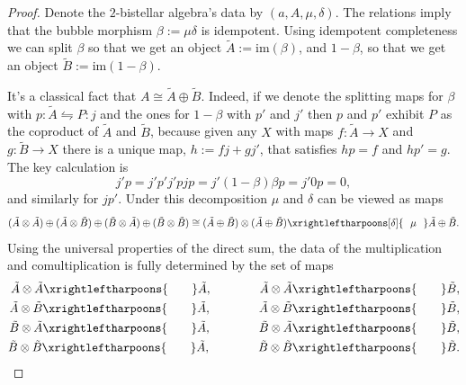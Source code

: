 \documentclass[12pt,a4paper]{article}
\numberwithin{equation}{section}
\begin{document}
\begin{proof}
    Denote the $2$-bistellar algebra's data by $(a, A, \mu, \delta)$. The relations imply that the bubble morphism $\beta := \mu \delta$ is idempotent. Using idempotent completeness we can split $\beta$ so that we get an object $\tilde{A}:= \mathrm{im}(\beta)$, and $1 - \beta$, so that we get an object $\tilde{B} := \mathrm{im}(1 - \beta)$. 
    
    It's a classical fact that $A \cong \tilde{A} \oplus \tilde{B}$. Indeed, if we denote the splitting maps for $\beta$ with $p: \tilde{A} \leftrightharpoons P: j$ and the ones for $1 - \beta$ with $p'$ and $j'$ then $p$ and $p'$ exhibit $P$ as the coproduct of $\tilde{A}$ and $\tilde{B}$, because given any $X$ with maps $f: \tilde{A} \to X$ and $g: \tilde{B} \to X$ there is a unique map, $h := f j + g j'$, that satisfies $h p = f$ and $h p' = g$. The key calculation is
    \begin{equation}
        j' p = j' p' j' p j p = j' (1 - \beta) \beta p = j' 0 p = 0,
    \end{equation}
    and similarly for $j p'$. Under this decomposition $\mu$ and $\delta$ can be viewed as maps
    \begin{equation}
        (\tilde{A} \otimes \tilde{A}) \oplus (\tilde{A} \otimes \tilde{B}) \oplus (\tilde{B} \otimes \tilde{A}) \oplus (\tilde{B} \otimes \tilde{B}) \cong (\tilde{A} \oplus \tilde{B}) \otimes (\tilde{A} \oplus \tilde{B}) \xrightleftharpoons[\delta]{\ \ \mu \ \ } \tilde{A} \oplus \tilde{B}.
    \end{equation}
    Using the universal properties of the direct sum, the data of the multiplication and comultiplication is fully determined by the set of maps
    \begin{align}
        \tilde{A} \otimes \tilde{A} \xrightleftharpoons{\ \ \ \ \ \ } \tilde{A}, \qquad \qquad \tilde{A} \otimes \tilde{A} \xrightleftharpoons{\ \ \ \ \ \ } \tilde{B}, \notag\\
        \tilde{A} \otimes \tilde{B} \xrightleftharpoons{\ \ \ \ \ \ } \tilde{A}, \qquad \qquad \tilde{A} \otimes \tilde{B} \xrightleftharpoons{\ \ \ \ \ \ } \tilde{B}, \notag\\
        \tilde{B} \otimes \tilde{A} \xrightleftharpoons{\ \ \ \ \ \ } \tilde{A}, \qquad \qquad \tilde{B} \otimes \tilde{A} \xrightleftharpoons{\ \ \ \ \ \ } \tilde{B}, \notag\\
        \tilde{B} \otimes \tilde{B} \xrightleftharpoons{\ \ \ \ \ \ } \tilde{A}, \qquad \qquad \tilde{B} \otimes \tilde{B} \xrightleftharpoons{\ \ \ \ \ \ } \tilde{B}.

\end{align}
\end{proof}
\end{document}
